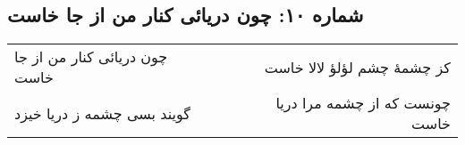 \begin{center}
\section*{شماره ۱۰: چون دریائی کنار من از جا خاست}
\label{sec:010}
\begin{longtable}{l p{0.5cm} r}
چون دریائی کنار من از جا خاست
&&
کز چشمهٔ چشم لؤلؤ لالا خاست
\\
گویند بسی چشمه ز دریا خیزد
&&
چونست که از چشمه مرا دریا خاست
\\
\end{longtable}
\end{center}
